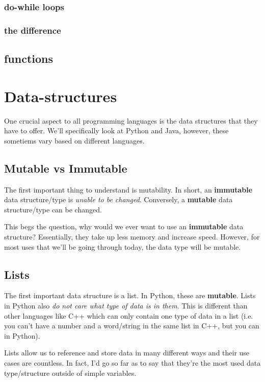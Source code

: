 \documentclass[12pt,a4paper]{book}
\begin{document}
				\subsection{do-while loops}
					\vspace{10cm}


				\subsection{the difference}
					\vspace{10cm}


		\section{functions}
		
	\chapter{Data-structures}  \label{chap:datastructures}
		One crucial aspect to all programming languages is the data structures that they have to offer. We'll specifically look at Python and Java, however, these sometiems vary based on different  languages.
		\section{Mutable vs Immutable}
			The first important thing to understand is mutability. In short, an \textbf{immutable} data structure/type is \textit{unable to be changed}. Conversely, a \textbf{mutable} data structure/type can be changed.
			
			This begs the question, why would we ever want to use an \textbf{immutable} data structure? Essentially, they take up less memory and increase speed. However, for most uses that we'll be going through today, the data type will be mutable.
		\section{Lists}
			The first important data structure is a list. In Python, these are \textbf{mutable}. Lists in Python also \textit{do not care what type of data is in them}. This is different than other languages like C++ which can only contain one type of data in a list (i.e. you can't have a number and a word/string in the same list in C++, but you can in Python).
			
			Lists allow us to reference and store data in many different ways and their use cases are countless. In fact, I'd go so far as to say that they're the most used data type/structure outside of simple variables.
			
\end{document}
